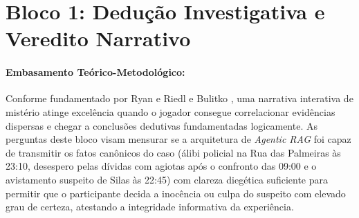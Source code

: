 \vspace{0.05cm}

\section{Bloco 1: Dedução Investigativa e Veredito Narrativo}
\label{sec:apendice_d_bloco1}

\paragraph*{Embasamento Teórico-Metodológico:} Conforme fundamentado por Ryan \cite{ryan2006interactive} e Riedl e Bulitko \cite{riedl2013interactive}, uma narrativa interativa de mistério atinge excelência quando o jogador consegue correlacionar evidências dispersas e chegar a conclusões dedutivas fundamentadas logicamente. As perguntas deste bloco visam mensurar se a arquitetura de \textit{Agentic RAG} foi capaz de transmitir os fatos canônicos do caso (álibi policial na Rua das Palmeiras às 23:10, desespero pelas dívidas com agiotas após o confronto das 09:00 e o avistamento suspeito de Silas às 22:45) com clareza diegética suficiente para permitir que o participante decida a inocência ou culpa do suspeito com elevado grau de certeza, atestando a integridade informativa da experiência.

